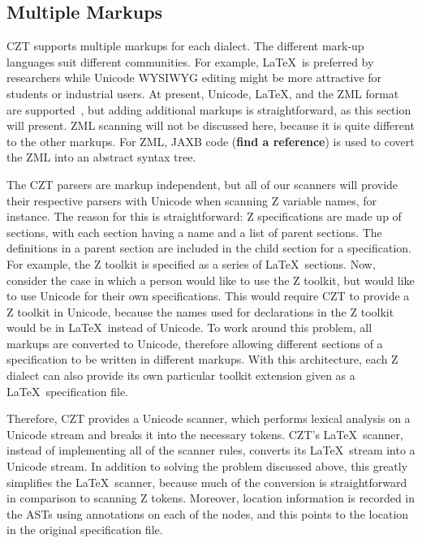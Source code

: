 \documentclass{llncs}
\begin{document}
\subsection{Multiple Markups}\label{multiple-markups}

 CZT supports multiple markups for each dialect.  The different
 mark-up languages suit different communities.  For example, \LaTeX\
 is preferred by researchers while Unicode WYSIWYG editing might be
 more attractive for students or industrial users. At present,
 Unicode, \LaTeX, and the ZML format are supported~\cite{UttEA:03},
 but adding additional markups is straightforward, as this section
 will present.  ZML scanning will not be discussed here, because it is
 quite different to the other markups. For ZML, JAXB code ({\bf find a
 reference}) is used to covert the ZML into an abstract syntax tree.

The CZT parsers are markup independent, but all of our scanners will
provide their respective parsers with Unicode when scanning Z variable
names, for instance. The reason for this is straightforward: Z specifications
are made up of sections, with each section having a name and a list of
parent sections. The definitions in a parent section are included in
the child section for a specification. For example, the Z toolkit is
specified as a series of \LaTeX\ sections. Now, consider the case in
which a person would like to use the Z toolkit, but would like to use
Unicode for their own specifications. This would require CZT to
provide a Z toolkit in Unicode, because the names used for
declarations in the Z toolkit would be in \LaTeX~instead of
Unicode. To work around this problem, all markups are converted to
Unicode, therefore allowing different sections of a specification to
be written in different markups.
With this architecture, each Z dialect can also provide its own
particular toolkit extension given as a \LaTeX\ specification file.

Therefore, CZT provides a Unicode scanner, which performs lexical
analysis on a Unicode stream and breaks it into the necessary
tokens. CZT's \LaTeX~scanner, instead of implementing all of the
scanner rules, converts its \LaTeX~stream into a Unicode stream. In
addition to solving the problem discussed above, this greatly
simplifies the \LaTeX~scanner, because much of the conversion is
straightforward in comparison to scanning Z tokens. Moreover, location
information is recorded in the ASTs using annotations on each of the
nodes, and this points to the location in the original specification file.
\end{document}

